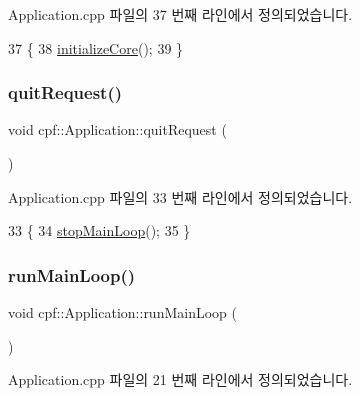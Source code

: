 Application.\+cpp 파일의 37 번째 라인에서 정의되었습니다.


\begin{DoxyCode}
37                                 \{
38         \hyperlink{classcpf_1_1_application_a676898244f732414360ced11ed65379c}{initializeCore}();
39     \}
\end{DoxyCode}
\mbox{\label{classcpf_1_1_application_ac5c5b81ebccee1f09d777a9fc200eca6}} 
\subsubsection{\texorpdfstring{quit\+Request()}{quitRequest()}}
{\footnotesize\ttfamily void cpf\+::\+Application\+::quit\+Request (\begin{DoxyParamCaption}{ }\end{DoxyParamCaption})}



Application.\+cpp 파일의 33 번째 라인에서 정의되었습니다.


\begin{DoxyCode}
33                                   \{
34         \hyperlink{classcpf_1_1_application_a527bcad0b3cf7a33ccc8de9318c6d984}{stopMainLoop}();
35     \}
\end{DoxyCode}
\mbox{\label{classcpf_1_1_application_a52e76d84434e072ad6dafdf7a0f4fd59}} 
\subsubsection{\texorpdfstring{run\+Main\+Loop()}{runMainLoop()}}
{\footnotesize\ttfamily void cpf\+::\+Application\+::run\+Main\+Loop (\begin{DoxyParamCaption}{ }\end{DoxyParamCaption})}



Application.\+cpp 파일의 21 번째 라인에서 정의되었습니다.


